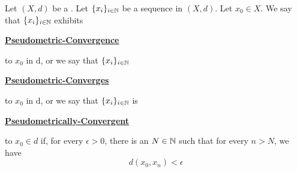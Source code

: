 \label{def:pseudometricsequenceconvergence}
\newcommand{\PseudometricConvergence}[0]{
    \bf \hyperref[def:pseudometricsequenceconvergence]{Pseudometric-Convergence} \rm
}
\newcommand{\PseudometricConvergent}[0]{
    \bf \hyperref[def:pseudometricsequenceconvergence]{Pseudometrically-Convergent} \rm
}
\newcommand{\PseudometricConverges}[0]{
    \bf \hyperref[def:pseudometricsequenceconvergence]{Pseudometric-Converges} \rm
}
\begin{df}
    Let $(X,d)$ be a \PseudometricSpace.
	Let $\{x_i\}_{i \in \mathbb{N}}$ be a sequence in $(X,d)$.
    Let $x_0 \in X$.  
    We say that 
	$\{x_i\}_{i \in \mathbb{N}}$ 
	exhibits 
	\PseudometricConvergence 
	to 
	$x_0$ 
	in d,
	or we say that 
	$\{x_i\}_{i \in \mathbb{N}}$  
	\PseudometricConverges 
	to 
	$x_0$ 
	in d, 
	or we say that 
	$\{x_i\}_{i \in \mathbb{N}}$ 
	is 
	\PseudometricConvergent 
	to 
	$x_0 \in d$ 
	if, 
    for every 
	$\epsilon > 0$, 
	there is an 
	$N \in \mathbb{N}$ 
	such that for every 
	$n>N$, 
	we have 
    \begin{equation}
        d(x_0, x_n) < \epsilon
    \end{equation}
\end{df}